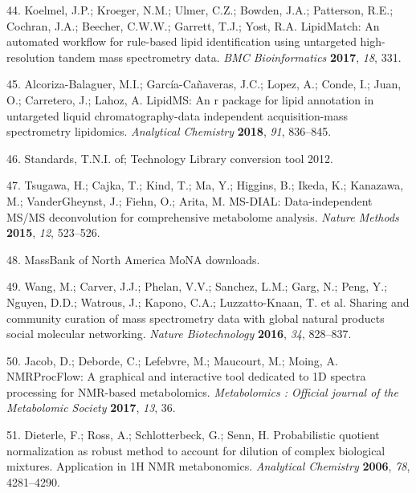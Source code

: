 \documentclass[]{article}
\begin{document}
\leavevmode\hypertarget{ref-koelmel_2017}{}%
44. Koelmel, J.P.; Kroeger, N.M.; Ulmer, C.Z.; Bowden, J.A.; Patterson, R.E.; Cochran, J.A.; Beecher, C.W.W.; Garrett, T.J.; Yost, R.A. LipidMatch: An automated workflow for rule-based lipid identification using untargeted high-resolution tandem mass spectrometry data. \emph{BMC Bioinformatics} \textbf{2017}, \emph{18}, 331.

\leavevmode\hypertarget{ref-alcorizabalaguer_2018}{}%
45. Alcoriza-Balaguer, M.I.; García-Cañaveras, J.C.; Lopez, A.; Conde, I.; Juan, O.; Carretero, J.; Lahoz, A. LipidMS: An r package for lipid annotation in untargeted liquid chromatography-data independent acquisition-mass spectrometry lipidomics. \emph{Analytical Chemistry} \textbf{2018}, \emph{91}, 836--845.

\leavevmode\hypertarget{ref-thenationalinstituteofstandardsandtechnology_website_2012}{}%
46. Standards, T.N.I. of; Technology Library conversion tool 2012.

\leavevmode\hypertarget{ref-tsugawa_2015}{}%
47. Tsugawa, H.; Cajka, T.; Kind, T.; Ma, Y.; Higgins, B.; Ikeda, K.; Kanazawa, M.; VanderGheynst, J.; Fiehn, O.; Arita, M. MS-DIAL: Data-independent MS/MS deconvolution for comprehensive metabolome analysis. \emph{Nature Methods} \textbf{2015}, \emph{12}, 523--526.

\leavevmode\hypertarget{ref-massbankofnorthamerica_website_nd}{}%
48. MassBank of North America MoNA downloads.

\leavevmode\hypertarget{ref-wang_2016}{}%
49. Wang, M.; Carver, J.J.; Phelan, V.V.; Sanchez, L.M.; Garg, N.; Peng, Y.; Nguyen, D.D.; Watrous, J.; Kapono, C.A.; Luzzatto-Knaan, T. et al. Sharing and community curation of mass spectrometry data with global natural products social molecular networking. \emph{Nature Biotechnology} \textbf{2016}, \emph{34}, 828--837.

\leavevmode\hypertarget{ref-jacob_2017}{}%
50. Jacob, D.; Deborde, C.; Lefebvre, M.; Maucourt, M.; Moing, A. NMRProcFlow: A graphical and interactive tool dedicated to 1D spectra processing for NMR-based metabolomics. \emph{Metabolomics : Official journal of the Metabolomic Society} \textbf{2017}, \emph{13}, 36.

\leavevmode\hypertarget{ref-dieterle_2006}{}%
51. Dieterle, F.; Ross, A.; Schlotterbeck, G.; Senn, H. Probabilistic quotient normalization as robust method to account for dilution of complex biological mixtures. Application in 1H NMR metabonomics. \emph{Analytical Chemistry} \textbf{2006}, \emph{78}, 4281--4290.
\end{document}
